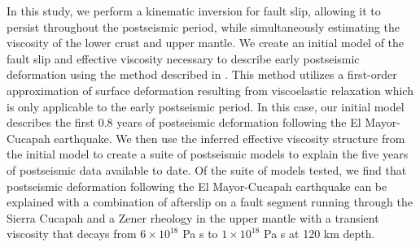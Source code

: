 \documentclass[draft,linenumbers]{AGUJournal}
\begin{document}
In this study, we perform a kinematic inversion for fault slip, allowing it to persist throughout the postseismic period, while simultaneously estimating the viscosity of the lower crust and upper mantle.  We create an initial model of the fault slip and effective viscosity necessary to describe early postseismic deformation using the method described in \citet{Hines2016}.  This method utilizes a first-order approximation of surface deformation resulting from viscoelastic relaxation which is only applicable to the early postseismic period. In this case, our initial model describes the first 0.8 years of postseismic deformation following the El Mayor-Cucapah earthquake.  We then use the inferred effective viscosity structure from the initial model to create a suite of postseismic models to explain the five years of postseismic data available to date.  Of the suite of models tested, we find that postseismic deformation following the El Mayor-Cucapah earthquake can be explained with a combination of afterslip on a fault segment running through the Sierra Cucapah and a Zener rheology in the upper mantle with a transient viscosity that decays from $6\times10^{18}$ Pa s to $1\times10^{18}$ Pa s at 120 km depth. 

\end{document}
